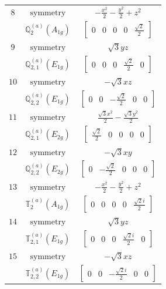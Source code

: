 \documentclass[fleqn,8pt,landscape]{jsarticle}
\begin{document}
\begin{longtable}{ccc}
$ 8 $ & $ \text{symmetry} $ & $ - \frac{x^{2}}{2} - \frac{y^{2}}{2} + z^{2} $ \\
$  $ & $ \mathbb{Q}_{2}^{(a)}(A_{1g}) $ & $ \begin{bmatrix} 0 & 0 & 0 & 0 & \frac{\sqrt{2}}{2} \end{bmatrix} $ \\ \hline
$ 9 $ & $ \text{symmetry} $ & $ \sqrt{3} y z $ \\
$  $ & $ \mathbb{Q}_{2,1}^{(a)}(E_{1g}) $ & $ \begin{bmatrix} 0 & 0 & 0 & \frac{\sqrt{2}}{2} & 0 \end{bmatrix} $ \\ \hline
$ 10 $ & $ \text{symmetry} $ & $ - \sqrt{3} x z $ \\
$  $ & $ \mathbb{Q}_{2,2}^{(a)}(E_{1g}) $ & $ \begin{bmatrix} 0 & 0 & - \frac{\sqrt{2}}{2} & 0 & 0 \end{bmatrix} $ \\ \hline
$ 11 $ & $ \text{symmetry} $ & $ \frac{\sqrt{3} x^{2}}{2} - \frac{\sqrt{3} y^{2}}{2} $ \\
$  $ & $ \mathbb{Q}_{2,1}^{(a)}(E_{2g}) $ & $ \begin{bmatrix} \frac{\sqrt{2}}{2} & 0 & 0 & 0 & 0 \end{bmatrix} $ \\ \hline
$ 12 $ & $ \text{symmetry} $ & $ - \sqrt{3} x y $ \\
$  $ & $ \mathbb{Q}_{2,2}^{(a)}(E_{2g}) $ & $ \begin{bmatrix} 0 & - \frac{\sqrt{2}}{2} & 0 & 0 & 0 \end{bmatrix} $ \\ \hline
$ 13 $ & $ \text{symmetry} $ & $ - \frac{x^{2}}{2} - \frac{y^{2}}{2} + z^{2} $ \\
$  $ & $ \mathbb{T}_{2}^{(a)}(A_{1g}) $ & $ \begin{bmatrix} 0 & 0 & 0 & 0 & \frac{\sqrt{2} i}{2} \end{bmatrix} $ \\ \hline
$ 14 $ & $ \text{symmetry} $ & $ \sqrt{3} y z $ \\
$  $ & $ \mathbb{T}_{2,1}^{(a)}(E_{1g}) $ & $ \begin{bmatrix} 0 & 0 & 0 & \frac{\sqrt{2} i}{2} & 0 \end{bmatrix} $ \\ \hline
$ 15 $ & $ \text{symmetry} $ & $ - \sqrt{3} x z $ \\
$  $ & $ \mathbb{T}_{2,2}^{(a)}(E_{1g}) $ & $ \begin{bmatrix} 0 & 0 & - \frac{\sqrt{2} i}{2} & 0 & 0 \end{bmatrix} $ \\ \hline

\end{longtable}
\end{document}
